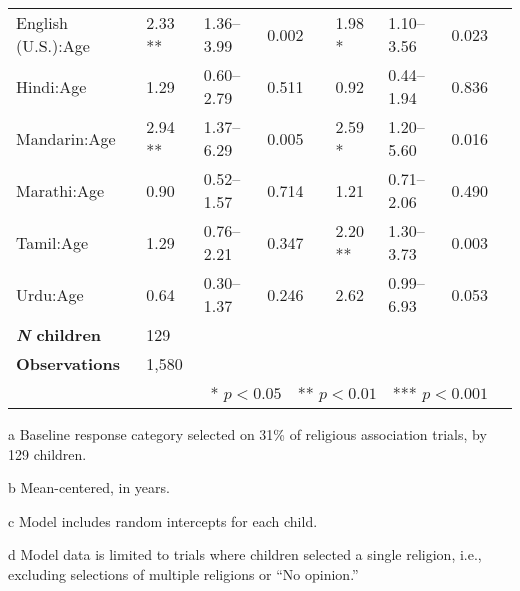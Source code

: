 \begin{table}[ht]
\begin{threeparttable}
\begin{tabular}{lllllllll}
English (U.S.):Age\tnote{b} & 2.33 ** & 1.36--3.99 & 0.002 &  & 1.98 * & 1.10--3.56 & 0.023 \\ 
Hindi:Age\tnote{b} & 1.29 & 0.60--2.79 & 0.511 &  & 0.92 & 0.44--1.94 & 0.836 \\ 
Mandarin:Age\tnote{b} & 2.94 ** & 1.37--6.29 & 0.005 &  & 2.59 * & 1.20--5.60 & 0.016 \\ 
Marathi:Age\tnote{b} & 0.90 & 0.52--1.57 & 0.714 &  & 1.21 & 0.71--2.06 & 0.490 \\ 
Tamil:Age\tnote{b} & 1.29 & 0.76--2.21 & 0.347 &  & 2.20 ** & 1.30--3.73 & 0.003 \\ 
Urdu:Age\tnote{b} & 0.64 & 0.30--1.37 & 0.246 &  & 2.62 & 0.99--6.93 & 0.053 \\ 
\midrule
\bfseries{\textit{N} children}\tnote{c} & 129 &  &  &  &  &  &  \\
\textbf{Observations}\tnote{d} & 1,580  &  &  &  &  &  &  \\
\bottomrule
\multicolumn{8}{r}{* $p<0.05$~~** $p<0.01$~~*** $p<0.001$}\\
\end{tabular}
\begin{tablenotes}[flushleft]
    \item[a] Baseline response category selected on 31\% of religious association trials, by 129 children. %
    \item[b] Mean-centered, in years.
    \item[c] Model includes random intercepts for each child.
    \item[d] Model data is limited to trials where children selected a single religion, i.e., excluding selections of multiple religions or ``No opinion.'' 
\end{tablenotes}
\end{threeparttable}
\end{table}